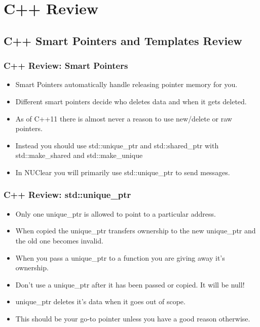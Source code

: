 \documentclass{beamer}
\begin{document}
\section{C++ Review}
\subsection{C++ Smart Pointers and Templates Review}
\begin{frame}
	\frametitle{C++ Review: Smart Pointers}
	\begin{itemize}
		\item Smart Pointers automatically handle releasing pointer memory for you.
		\item Different smart pointers decide who deletes data and when it gets deleted.
		\item As of C++11 there is almost never a reason to use new/delete or raw pointers.
		\item Instead you should use std::unique\_ptr and std::shared\_ptr with std::make\_shared and std::make\_unique
		\item In NUClear you will primarily use std::unique\_ptr to send messages.
	\end{itemize}
\end{frame}

\begin{frame}
	\frametitle{C++ Review: std::unique\_ptr}
	\begin{itemize}
		\item Only one unique\_ptr is allowed to point to a particular address.
		\item When copied the unique\_ptr transfers ownership to the new unique\_ptr and the old one becomes invalid.
		\item When you pass a unique\_ptr to a function you are giving away it's ownership.
		\item Don't use a unique\_ptr after it has been passed or copied. It will be null!
		\item unique\_ptr deletes it's data when it goes out of scope. 
		\item This should be your go-to pointer unless you have a good reason otherwise.
	\end{itemize}
\end{frame}
\end{document}
